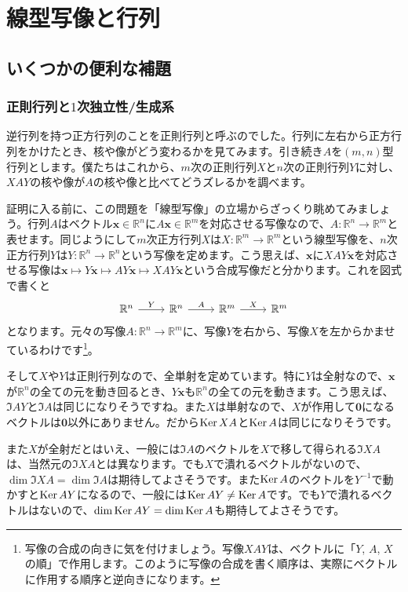 \chapter{線型写像と行列}

\section{いくつかの便利な補題}

\subsection{正則行列と$1$次独立性/生成系}

逆行列を持つ正方行列のことを正則行列と呼ぶのでした。行列に左右から正方行列をかけたとき、核や像がどう変わるかを見てみます。引き続き$A$を$(m, n)$型行列とします。僕たちはこれから、$m$次の正則行列$X$と$n$次の正則行列$Y$に対し、$XAY$の核や像が$A$の核や像と比べてどうズレるかを調べます。

証明に入る前に、この問題を「線型写像」の立場からざっくり眺めてみましょう。行列$A$はベクトル$\bm{x} \in \mathbb{R}^n$に$A\bm{x} \in \mathbb{R}^m$を対応させる写像なので、$A\colon \mathbb{R}^n \rightarrow \mathbb{R}^m$と表せます。同じようにして$m$次正方行列$X$は$X\colon \mathbb{R}^m\rightarrow\mathbb{R}^m$という線型写像を、$n$次正方行列$Y$は$Y\colon \mathbb{R}^n\rightarrow\mathbb{R}^n$という写像を定めます。こう思えば、$\bm{x}$に$XAY\bm{x}$を対応させる写像は$\bm{x}\mapsto Y\bm{x} \mapsto AY\bm{x} \mapsto XAY\bm{x}$という合成写像だと分かります。これを図式で書くと
\[
\begin{tikzcd}
\mathbb{R}^n \arrow{r}{Y} & \mathbb{R}^n \arrow{r}{A} & \mathbb{R}^m \arrow{r}{X} & \mathbb{R}^m
\end{tikzcd}
\]
となります。元々の写像$A\colon \mathbb{R}^n\rightarrow\mathbb{R}^m$に、写像$Y$を右から、写像$X$を左からかませているわけです\footnote{写像の合成の向きに気を付けましょう。写像$XAY$は、ベクトルに「$Y$, $A$, $X$の順」で作用します。このように写像の合成を書く順序は、実際にベクトルに作用する順序と逆向きになります。}。

そして$X$や$Y$は正則行列なので、全単射を定めています。特に$Y$は全射なので、$\bm{x}$が$\mathbb{R}^n$の全ての元を動き回るとき、$Y\bm{x}$も$\mathbb{R}^n$の全ての元を動きます。こう思えば、$\Im AY$と$\Im A$は同じになりそうですね。また$X$は単射なので、$X$が作用して$\bm{0}$になるベクトルは$\bm{0}$以外にありません。だから$\operatorname{Ker} XA$と$\operatorname{Ker} A$は同じになりそうです。

また$X$が全射だとはいえ、一般には$\Im A$のベクトルを$X$で移して得られる$\Im XA$は、当然元の$\Im XA$とは異なります。でも$X$で潰れるベクトルがないので、$\dim \Im XA = \dim \Im A$は期待してよさそうです。また$\operatorname{Ker} A$のベクトルを$Y^{-1}$で動かすと$\operatorname{Ker} AY$になるので、一般には$\operatorname{Ker} AY \neq \operatorname{Ker} A$です。でも$Y$で潰れるベクトルはないので、$\dim \operatorname{Ker} AY = \dim \operatorname{Ker} A$も期待してよさそうです。

